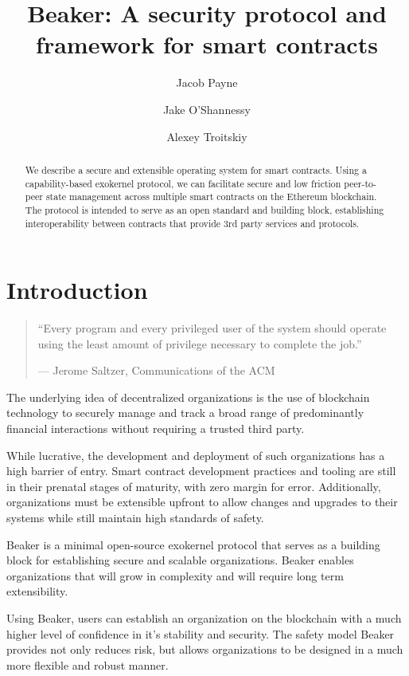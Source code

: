 \documentclass[english,a4paper]{article}
\title{Beaker: A security protocol and framework for smart
contracts}\label{beaker-a-security-protocol-and-framework-for-smart-contracts}
\author{Jacob Payne \and Jake O'Shannessy \and Alexey Troitskiy}
\begin{document}
\maketitle

\begin{abstract}\label{abstract}

We describe a secure and extensible operating system for smart
contracts. Using a capability-based exokernel protocol, we can
facilitate secure and low friction peer-to-peer state management across
multiple smart contracts on the Ethereum blockchain. The protocol is
intended to serve as an open standard and building block, establishing
interoperability between contracts that provide 3rd party services and
protocols.

\end{abstract}

\newpage
\tableofcontents
\newpage

\section{Introduction}\label{introduction}
\begin{quote}
``Every program and every privileged user of the system should operate
using the least amount of privilege necessary to complete the job.''

--- Jerome Saltzer, Communications of the ACM
\end{quote}

The underlying idea of decentralized organizations is the use of
blockchain technology to securely manage and track a broad range of
predominantly financial interactions without requiring a trusted third
party.

While lucrative, the development and deployment of such organizations
has a high barrier of entry. Smart contract development practices and
tooling are still in their prenatal stages of maturity, with zero margin
for error. Additionally, organizations must be extensible upfront to
allow changes and upgrades to their systems while still maintain high
standards of safety.

Beaker is a minimal open-source exokernel protocol that serves as a
building block for establishing secure and scalable organizations.
Beaker enables organizations that will grow in complexity and will
require long term extensibility.

Using Beaker, users can establish an organization on the blockchain with
a much higher level of confidence in it's stability and security. The
safety model Beaker provides not only reduces risk, but allows
organizations to be designed in a much more flexible and robust manner.
\end{document}
